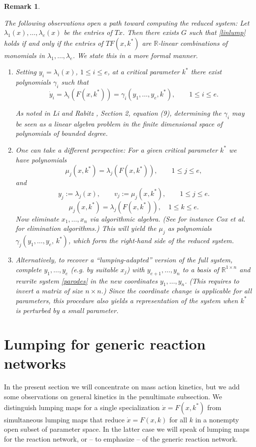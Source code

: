 \documentclass{article}
\newtheorem{remark}{Remark}
\begin{document}
\begin{remark}\label{redcomprem}{\em 
The following observations open a path toward computing the reduced system: Let $\lambda_1(x),\ldots,\lambda_e(x)$ be the entries of $Tx$. Then there exists $G$ such that \eqref{linlump} holds if and only if the entries of $TF(x,k^*)$ are $\mathbb R$-linear combinations of monomials in $\lambda_1, \ldots,\lambda_e$. We state this in a more formal manner.
\begin{enumerate}
    \item 
Setting
$y_i=\lambda_i(x)$, $1\leq i\leq e$,
at a critical parameter $k^*$ there exist polynomials $\gamma_i$ such that
\[
\dot y_i=\lambda_i(F(x,k^*))=
\gamma_i(y_1,\ldots,y_e,k^*),\qquad 1\leq i\leq e.
\]

As noted in Li and Rabitz \cite{LR1989}, Section 2, equation (9), determining the $\gamma_i$ may be seen as a linear algebra problem in the finite dimensional space of polynomials of bounded degree.
\item One can take a different perspective: For a given critical parameter $k^*$ we have polynomials 
\[
\mu_j(x,k^*)=\lambda_j(F(x,k^*)),\qquad 1\leq j\leq e,
\]
and
\[
y_j:=\lambda_j(x),\qquad v_j:=\mu_j(x,k^*),\qquad 1\leq j\leq e.
\]
\[
\mu_j(x,k^*)=\lambda_j(F(x,k^*)),\quad 1\leq k\leq e.
\]
Now eliminate $x_1,\ldots,x_n$ via algorithmic algebra. (See for instance Cox et al.\ \cite{CLOS} for elimination algorithms.) This will yield the $\mu_j$ as polynomials $\gamma_j(y_1,\ldots,y_e,\,k^*)$, which form the right-hand side of the reduced system.
\item Alternatively, to recover a ``lumping-adapted'' version of the full system, complete $y_1,\ldots, y_e$ (e.g. by suitable $x_j$) with $y_{e+1},\ldots, y_n$ to a basis of $\mathbb R^{1\times n}$ and rewrite system \ref{parodes} in the new coordinates $y_1,\ldots,y_n$. (This requires to invert a matrix of size $n\times n$.) Since the coordinate change is applicable for all parameters, this procedure also yields a representation of the system when $k^*$ is perturbed by a small parameter.
\end{enumerate}
}
\end{remark}

\section{Lumping for generic reaction networks}\label{sec:genlump}
In the present section we will concentrate on mass action kinetics, but we add some observations on general kinetics in the penultimate  subsection. 
We distinguish lumping maps for a single specialization $\dot x=F(x,k^*)$ from simultaneous lumping maps that reduce $\dot x=F(x,k)$ for all $k$ in a nonempty open subset of parameter space. In the latter case we will speak of lumping maps for the reaction network, or -- to emphasize -- of the generic reaction network.
\end{document}
